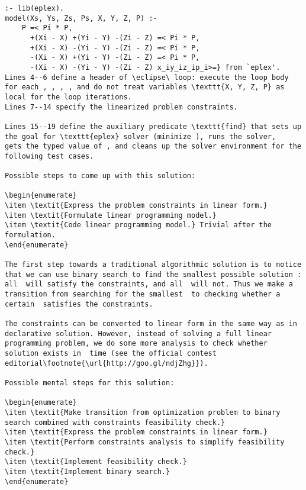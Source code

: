 \documentclass{acm_proc_article-sp}
\begin{document}
\begin{lstlisting}[caption={Linear programming solution for ``Star Wars''}]
:- lib(eplex).
model(Xs, Ys, Zs, Ps, X, Y, Z, P) :-
    P =< Pi * P,
      +(Xi - X) +(Yi - Y) -(Zi - Z) =< Pi * P,
      +(Xi - X) -(Yi - Y) -(Zi - Z) =< Pi * P,
      -(Xi - X) +(Yi - Y) -(Zi - Z) =< Pi * P,
      -(Xi - X) -(Yi - Y) -(Zi - Z) x_iy_iz_ip_i>=} from `eplex'. 
Lines 4--6 define a header of \eclipse\ loop: execute the loop body for each , , , , and do not treat variables \texttt{X, Y, Z, P} as local for the loop iterations.
Lines 7--14 specify the linearized problem constraints.

Lines 15--19 define the auxiliary predicate \texttt{find} that sets up the goal for \texttt{eplex} solver (minimize ), runs the solver, 
gets the typed value of , and cleans up the solver environment for the following test cases. 

Possible steps to come up with this solution:

\begin{enumerate}
\item \textit{Express the problem constraints in linear form.}
\item \textit{Formulate linear programming model.}
\item \textit{Code linear programming model.} Trivial after the formulation.
\end{enumerate}

The first step towards a traditional algorithmic solution is to notice that we can use binary search to find the smallest possible solution : all  will satisfy the constraints, and all  will not. Thus we make a transition from searching for the smallest  to checking whether a certain  satisfies the constraints.

The constraints can be converted to linear form in the same way as in declarative solution. However, instead of solving a full linear programming problem, we do some more analysis to check whether solution exists in  time (see the official contest editorial\footnote{\url{http://goo.gl/ndjZhg}}). 

Possible mental steps for this solution:

\begin{enumerate}
\item \textit{Make transition from optimization problem to binary search combined with constraints feasibility check.}
\item \textit{Express the problem constraints in linear form.}
\item \textit{Perform constraints analysis to simplify feasibility check.}
\item \textit{Implement feasibility check.} 
\item \textit{Implement binary search.} 
\end{enumerate}


\end{lstlisting}
\end{document}
